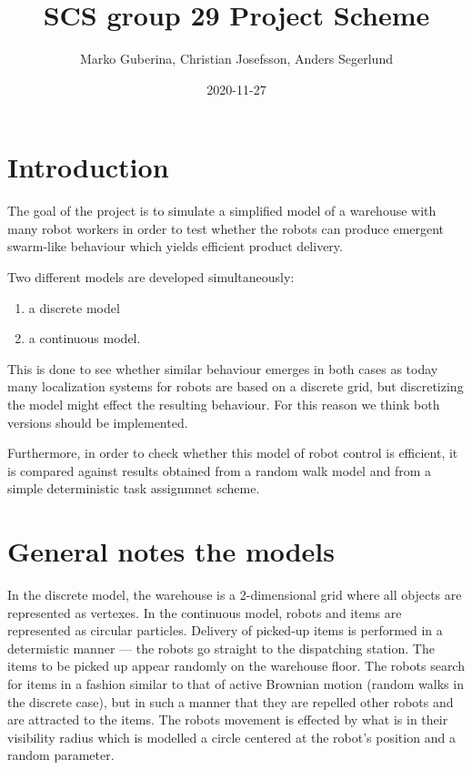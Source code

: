 \documentclass{article}
\title{SCS group 29 Project Scheme}
\date{2020-11-27}
\author{Marko Guberina, Christian Josefsson, Anders Segerlund}
\begin{document}
\maketitle
\newpage
{}

\section{Introduction}
The goal of the project is to simulate a simplified model 
of a warehouse with many robot workers in order to test whether 
the robots can produce emergent swarm-like behaviour which yields
efficient product delivery.

Two different models are developed simultaneously:

\begin{enumerate}
		\item a discrete model
		\item a continuous model.
\end{enumerate}

This is done to see whether similar behaviour emerges
in both cases as today many localization systems for robots are based 
on a discrete grid, but discretizing the model might effect the
resulting behaviour. For this reason we think both versions should be implemented.

Furthermore, in order to check whether this model of robot control
is efficient, it is compared against results obtained from a
random walk model and from a simple deterministic task assignmnet scheme.

\section{General notes the models}
In the discrete model, the warehouse is a 2-dimensional grid where
all objects are represented as vertexes.
In the continuous model, robots and items are represented as circular
particles.
Delivery of picked-up items is performed in a determistic manner ---
the robots go straight to the dispatching station. 
The items to be picked up appear randomly on the warehouse floor.
The robots search for items in a fashion similar to that of active Brownian
motion (random walks in the discrete case), 
but in such a manner that they are repelled other robots and are attracted 
to the items. 
The robots movement is effected by what is in their visibility radius which is 
modelled a circle centered at the robot's position and a random parameter.
\end{document}
